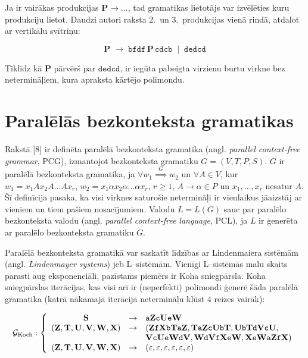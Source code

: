 \documentclass[utf8]{ludis2022}
\begin{document}
Ja ir vairākas produkcijas $\mathbf{P} \to \ldots$, tad gramatikas lietotājs var 
izvēlēties kuru produkciju lietot. 
Daudzi autori raksta 2.\ un 3.\ 
produkcijas vienā rindā, atdalot ar 
vertikālu svītriņu: 

$$\mathbf{P} \;\to\; \mathtt{bfdf}\,\mathbf{P}\,\mathtt{cdcb} \;\mid\; \mathtt{dedcd}$$


Tiklīdz kā $\mathbf{P}$ pārvērš par 
$\mathtt{dedcd}$, ir iegūta pabeigta
virzienu burtu virkne bez netermināļiem, 
kura apraksta kārtējo polimondu. 

\vspace{10pt}


\section{Paralēlās bezkonteksta gramatikas}


\firstparskip Rakstā [8] ir definēta paralēlā bezkonteksta gramatika (angl. {\em parallel context-free grammar}, PCG), izmantojot bezkonteksta gramatiku $G = (V, T, P, S)$. $G$ ir paralēlā bezkonteksta gramatika, ja $\forall  w_1 \overset{G}{\implies} w_2$ un $\forall A \in V$, 
kur $w_1 = x_1Ax_2A ... Ax_r$, $w_2 = x_1\alpha x_2\alpha ... \alpha x_r$, $r \geq 1$, $A \to \alpha \in P$ 
un $x_1, \ldots, x_r$ nesatur $A$. Šī definīcija pasaka, ka visi virknes saturošie netermināļi ir vienlaikus jāaizstāj ar vieniem un tiem pašiem nosacījumiem. Valodu $L=L(G)$ sauc par paralēlo bezkonteksta valodu (angl. {\em parallel context-free language}, PCL), ja $L$ ir ģenerēta ar paralēlo bezkonteksta gramatiku $G$.

Paralēlā bezkonteksta gramatikā var saskatīt līdzības ar Lindenmaiera sistēmām (angl. {\em  Lindenmayer systems}) jeb L--sistēmām. Vienīgi L--sistēmās malu skaits parasti aug eksponenciāli, pazīstams piemērs ir Koha sniegpārsla. Koha sniegpārslas iterācijas, kas visi arī ir (neperfekti) 
polimondi ģenerē šāda paralēlā gramatika (katrā nākamajā 
iterācijā netermināļu kļūst $4$ reizes vairāk): 

$$\mathcal{G}_{\text{Koch}}: 
\left\{ 
\begin{array}{ccl}
\bf{S} &\to& \mathtt{a}\bf{Z}\mathtt{c}\bf{U}\mathtt{e}\bf{W}\\

(\bf{Z}, \bf{T}, \bf{U}, \bf{V}, \bf{W}, \bf{X}) &\to& (\bf{Z}\mathtt{f}\bf{X}\mathtt{b}\bf{T}\mathtt{a}\bf{Z}, 
\bf{T}\mathtt{a}\bf{Z}\mathtt{c}\bf{U}\mathtt{b}\bf{T}, 
\bf{U}\mathtt{b}\bf{T}\mathtt{d}\bf{V}\mathtt{c}\bf{U},\\ 
 & & \bf{V}\mathtt{c}\bf{U}\mathtt{e}\bf{W}\mathtt{d}\bf{V},
\bf{W}\mathtt{d}\bf{V}\mathtt{f}\bf{X}\mathtt{e}\bf{W}, 
\bf{X}\mathtt{e}\bf{W}\mathtt{a}\bf{Z}\mathtt{f}\bf{X})\\
(\bf{Z}, \bf{T}, \bf{U}, \bf{V}, \bf{W}, \bf{X}) &\to& (\varepsilon, \varepsilon, \varepsilon, \varepsilon, \varepsilon, \varepsilon)\\
\end{array}
\right.
$$
\end{document}
